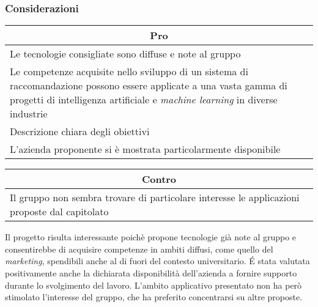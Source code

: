 \subsubsection{Considerazioni}
\begin{minipage}[t]{0.45\linewidth}
    \vspace{0pt}
    {\renewcommand{\arraystretch}{1.5}
    \begin{tabular}{p{1\linewidth}}
        \multicolumn{1}{c}{\textbf{Pro}} \\
        \midrule
        Le tecnologie consigliate sono diffuse e note al gruppo \\
        Le competenze acquisite nello sviluppo di un sistema di raccomandazione possono essere applicate a una vasta gamma di progetti di intelligenza artificiale e \textit{machine learning} in diverse industrie \\
        Descrizione chiara degli obiettivi \\
        L'azienda proponente si è mostrata particolarmente disponibile \\
        \hline
    \end{tabular}
    }
\end{minipage}
\hspace{0.05\linewidth}
\begin{minipage}[t]{0.45\linewidth}
    \vspace{0pt}
    {\renewcommand{\arraystretch}{1.5}
    \begin{tabular}{p{1\linewidth}}
        \multicolumn{1}{c}{\textbf{Contro}} \\
        \midrule
        Il gruppo non sembra trovare di particolare interesse le applicazioni proposte dal capitolato \\
        \hline
    \end{tabular}
    }
\end{minipage}
\vspace{1em}

\noindent
Il progetto risulta interessante poichè propone tecnologie già note al gruppo e consentirebbe di acquisire competenze in ambiti diffusi, come quello del \textit{marketing}, spendibili anche al di fuori del contesto universitario. \'E stata valutata positivamente anche la dichiarata disponibilità dell'azienda a fornire supporto durante lo svolgimento del lavoro.
L'ambito applicativo presentato non ha però stimolato l'interesse del gruppo, che ha preferito concentrarsi su altre proposte.